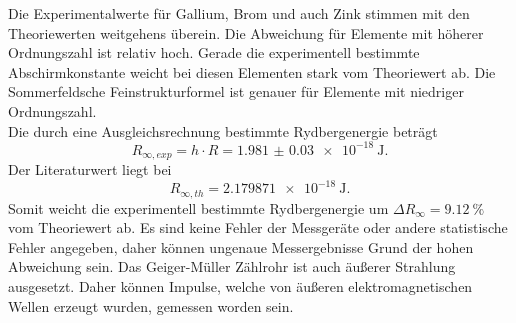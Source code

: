 Die Experimentalwerte für Gallium, Brom und auch Zink stimmen mit den Theoriewerten weitgehens überein.
Die Abweichung für Elemente mit höherer Ordnungszahl ist relativ hoch.
Gerade die experimentell bestimmte Abschirmkonstante weicht bei diesen Elementen stark vom Theoriewert ab.
Die Sommerfeldsche Feinstrukturformel ist genauer für Elemente mit niedriger Ordnungszahl.
\\
Die durch eine Ausgleichsrechnung bestimmte Rydbergenergie beträgt
\begin{equation*}
    R_{\infty ,exp} = h \cdot R = \SI{1.981(30)e-18}{\joule} .
\end{equation*}
Der Literaturwert \cite{konst} liegt bei
\begin{equation*}
    R_{\infty ,th} = \SI{2.179871e-18}{\joule} .
\end{equation*}
Somit weicht die experimentell bestimmte Rydbergenergie um $\Delta R_\infty = \SI{9.12}{\percent}$ vom Theoriewert ab.
Es sind keine Fehler der Messgeräte oder andere statistische Fehler angegeben, daher können ungenaue Messergebnisse Grund der hohen Abweichung sein.
Das Geiger-Müller Zählrohr ist auch äußerer Strahlung ausgesetzt.
Daher können Impulse, welche von äußeren elektromagnetischen Wellen erzeugt wurden, gemessen worden sein.